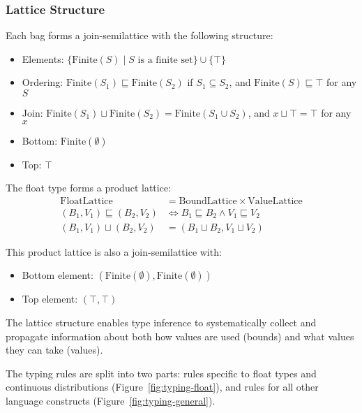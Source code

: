 \subsubsection{Lattice Structure}

Each bag forms a join-semilattice with the following structure:
\begin{itemize}
    \item Elements: $\{\text{Finite}(S) \mid S \text{ is a finite set}\} \cup \{\top\}$
    \item Ordering: $\text{Finite}(S_1) \sqsubseteq \text{Finite}(S_2)$ if $S_1 \subseteq S_2$, and $\text{Finite}(S) \sqsubseteq \top$ for any $S$
    \item Join: $\text{Finite}(S_1) \sqcup \text{Finite}(S_2) = \text{Finite}(S_1 \cup S_2)$, and $x \sqcup \top = \top$ for any $x$
    \item Bottom: $\text{Finite}(\emptyset)$
    \item Top: $\top$
\end{itemize}

The float type forms a product lattice:
\begin{align}
\text{FloatLattice} &= \text{BoundLattice} \times \text{ValueLattice} \\
(B_1, V_1) \sqsubseteq (B_2, V_2) &\iff B_1 \sqsubseteq B_2 \land V_1 \sqsubseteq V_2 \\
(B_1, V_1) \sqcup (B_2, V_2) &= (B_1 \sqcup B_2, V_1 \sqcup V_2)
\end{align}

This product lattice is also a join-semilattice with:
\begin{itemize}
    \item Bottom element: $(\text{Finite}(\emptyset), \text{Finite}(\emptyset))$
    \item Top element: $(\top, \top)$
\end{itemize}

The lattice structure enables type inference to systematically collect and propagate information about both how values are used (bounds) and what values they can take (values).



The typing rules are split into two parts: rules specific to float types and continuous distributions (Figure~\ref{fig:typing-float}), and rules for all other language constructs (Figure~\ref{fig:typing-general}).






